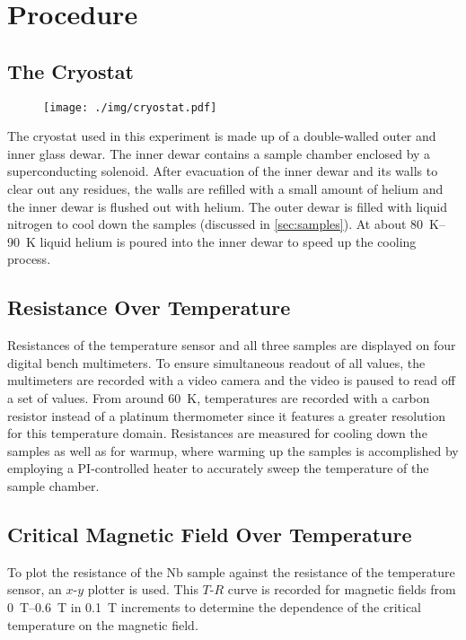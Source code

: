 \chapter{Procedure}
\section{The Cryostat}
\begin{figure}
	\centering
	\texttt{[image: ./img/cryostat.pdf]}
\end{figure}
The cryostat used in this experiment is made up of a double-walled outer and inner glass dewar.
The inner dewar contains a sample chamber enclosed by a superconducting solenoid.
After evacuation of the inner dewar and its walls to clear out any residues, the walls are refilled with a small amount of helium and the inner dewar is flushed out with helium.
The outer dewar is filled with liquid nitrogen to cool down the samples (discussed in \autoref{sec:samples}).
At about \SIrange{80}{90}{\kelvin} liquid helium is poured into the inner dewar to speed up the cooling process.

\section{Resistance Over Temperature}
Resistances of the temperature sensor and all three samples are displayed on four digital bench multimeters.
To ensure simultaneous readout of all values, the multimeters are recorded with a video camera and the video is paused to read off a set of values.
From around \SI{60}{\kelvin}, temperatures are recorded with a carbon resistor instead of a platinum thermometer since it features a greater resolution for this temperature domain.
Resistances are measured for cooling down the samples as well as for warmup, where warming up the samples is accomplished by employing a PI-controlled heater to accurately sweep the temperature of the sample chamber.

\section{Critical Magnetic Field Over Temperature}
To plot the resistance of the Nb sample against the resistance of the temperature sensor, an $x$-$y$ plotter is used.
This $T$-$R$ curve is recorded for magnetic fields from \SIrange{0}{0.6}{\tesla} in \SI{0.1}{\tesla} increments to determine the dependence of the critical temperature on the magnetic field.
